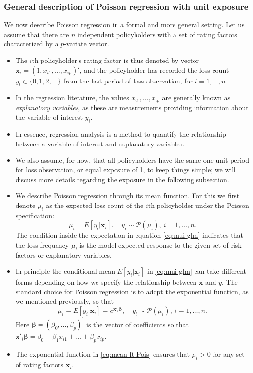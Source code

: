 \documentclass[ignorenonframetext,]{beamer}
\begin{document}
\begin{frame}[allowframebreaks]
\frametitle{General description of Poisson regression with unit exposure}

We now describe Poisson regression in a formal and more general setting. Let us assume that there are $n$ independent policyholders with a set of rating factors characterized by a $p$-variate vector.
\begin{itemize}
\item The $i$th policyholder's rating factor is thus denoted by vector $\mathbf{ x}_i=(1, x_{i1}, \ldots, x_{ip})'$, and the policyholder has recorded the loss count $y_i \in \{0,1,2, \ldots \}$ from the last period of loss observation, for $i=1, \ldots, n$. 
\item In the regression literature, the values $x_{i1}, \ldots, x_{ip}$ are generally known as \emph{explanatory variables}, as these are measurements providing information about the variable of interest $y_i$. 
\item In essence, regression analysis is a method to quantify the relationship between a variable of interest and explanatory variables.
\end{itemize}


\framebreak
\begin{itemize}
\item We also assume, for now, that all policyholders have the same one unit period for loss observation, or equal exposure of 1, to keep things simple; we will discuss more details regarding the exposure in the following subsection. 
\item We describe Poisson regression through its mean function. For this we first denote $\mu_i$ as the expected loss count of the $i$th policyholder under the Poisson specification:
\begin{equation} \label{eq:mui-glm}
\mu_i=E[{y_i|\mathbf{ x}_i}], \quad y_i \sim \mathcal{P}(\mu_i), \ i=1, \ldots, n.
\end{equation}
The condition inside the expectation in equation \eqref{eq:mui-glm} indicates that the loss frequency $\mu_i$ is the model expected response to the given set of risk factors or explanatory variables. 
\item In principle the conditional mean $E[{y_i|\mathbf{ x}_i}]$ in \eqref{eq:mui-glm} can take different forms depending on how we specify the relationship between $\mathbf{ x}$ and $y$. The standard choice for Poisson regression is to adopt the exponential function, as we mentioned previously, so that
\begin{equation} \label{eq:mean-ft-Pois}
\mu_i=E[{y_i|\mathbf{ x}_i}]=e^{\mathbf{ x}'_i\boldsymbol \beta}, \quad y_i \sim \mathcal{P}(\mu_i), \ i=1, \ldots, n.
\end{equation}
Here $\boldsymbol \beta=(\beta_0, \ldots, \beta_p)^{\prime}$ is the vector of coefficients so that $\mathbf{ x}'_i \boldsymbol \beta=\beta_0+\beta_1x_{i1} +\ldots+\beta_p x_{ip}$.
\item The exponential function in \eqref{eq:mean-ft-Pois} ensures that $\mu_i >0$ for any set of rating factors $\mathbf{ x}_i$.
\end{itemize}


\end{frame}
\end{document}
